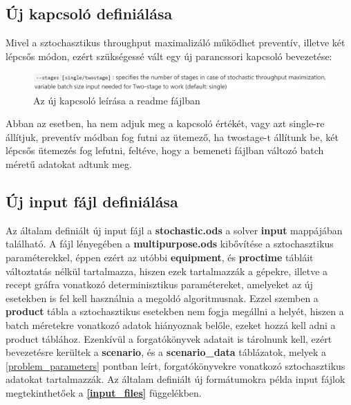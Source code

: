 \subsection{Új kapcsoló definiálása}
Mivel a sztochasztikus throughput maximalizáló működhet preventív, illetve két lépcsős módon, ezért szükségessé vált egy új parancssori kapcsoló bevezetése:
\begin{figure}[H]
\begin{center}
\includegraphics[scale=0.4]{switch}
\caption{Az új kapcsoló leírása a readme fájlban}
\label{switch}
\end{center}
\end{figure}
Abban az esetben, ha nem adjuk meg a kapcsoló értékét, vagy azt single-re állítjuk, preventív módban fog futni az ütemező, ha twostage-t állítunk be, két lépcsős ütemezés fog lefutni, feltéve, hogy a bemeneti fájlban változó batch méretű adatokat adtunk meg.
\subsection{Új input fájl definiálása}
Az általam definiált új input fájl a \textbf{stochastic.ods} a solver \textbf{input} mappájában található. A fájl lényegében a \textbf{multipurpose.ods} kibővítése a sztochasztikus paraméterekkel, éppen ezért az utóbbi \textbf{equipment}, és \textbf{proctime} tábláit változtatás nélkül tartalmazza, hiszen ezek tartalmazzák a gépekre, illetve a recept gráfra vonatkozó determinisztikus paramétereket, amelyeket az új esetekben is fel kell használnia a megoldó algoritmusnak. Ezzel szemben a \textbf{product} tábla a sztochasztikus esetekben nem fogja megállni a helyét, hiszen a batch méretekre vonatkozó adatok hiányoznak belőle, ezeket hozzá kell adni a product táblához. Ezenkívül a forgatókönyvek adatait is tárolnunk kell, ezért bevezetésre kerültek a\textbf{ scenario}, és a \textbf{scenario\_data} táblázatok, melyek a \ref{problem_parameters} pontban leírt, forgatókönyvekre vonatkozó sztochasztikus adatokat tartalmazzák. Az általam definiált új formátumokra példa input fájlok megtekinthetőek a \textbf{\ref{input_files}} függelékben.
